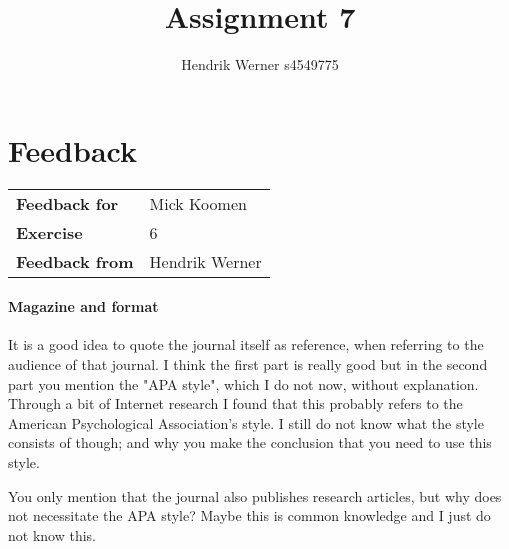 \documentclass[12pt, a4paper]{article}
\title{Assignment 7}
\author{Hendrik Werner s4549775}
\begin{document}
\maketitle

\clearpage
\section*{Feedback}
\begin{tabular}{l l}
	\textbf{Feedback for} & Mick Koomen\\
	\textbf{Exercise} & 6\\
	\textbf{Feedback from} & Hendrik Werner\\
\end{tabular}

\paragraph{Magazine and format}
It is a good idea to quote the journal itself as reference, when referring to the audience of that journal. I think the first part is really good but in the second part you mention the "APA style", which I do not now, without explanation. Through a bit of Internet research I found that this probably refers to the American Psychological Association's style. I still do not know what the style consists of though; and why you make the conclusion that you need to use this style.

You only mention that the journal also publishes research articles, but why does not necessitate the APA style? Maybe this is common knowledge and I just do not know this.
\end{document}
